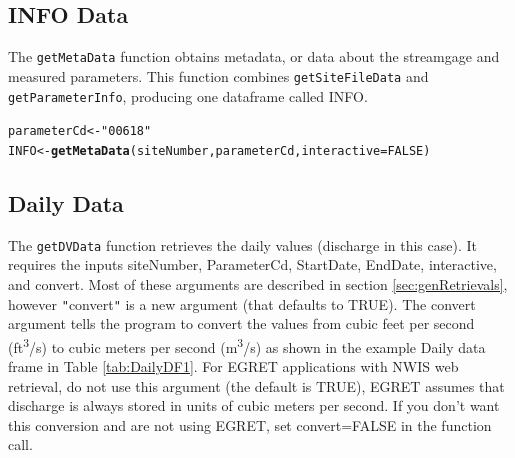 \documentclass[a4paper,11pt]{article}\usepackage[]{graphicx}\usepackage[]{color}
\makeatletter
\newcommand{\hlnum}[1]{\textcolor[rgb]{0.686,0.059,0.569}{#1}}%
\newcommand{\hlstr}[1]{\textcolor[rgb]{0.192,0.494,0.8}{#1}}%
\newcommand{\hlstd}[1]{\textcolor[rgb]{0.345,0.345,0.345}{#1}}%
\newcommand{\hlkwb}[1]{\textcolor[rgb]{0.69,0.353,0.396}{#1}}%
\newcommand{\hlkwc}[1]{\textcolor[rgb]{0.333,0.667,0.333}{#1}}%
\newcommand{\hlkwd}[1]{\textcolor[rgb]{0.737,0.353,0.396}{\textbf{#1}}}%
\newenvironment{kframe}{%
 \def\at@end@of@kframe{}%
 \ifinner\ifhmode%
  \def\at@end@of@kframe{\end{minipage}}%
  \begin{minipage}{\columnwidth}%
 \fi\fi%
 \def\FrameCommand##1{\hskip\@totalleftmargin \hskip-\fboxsep
 \colorbox{shadecolor}{##1}\hskip-\fboxsep
     \hskip-\linewidth \hskip-\@totalleftmargin \hskip\columnwidth}%
 \MakeFramed {\advance\hsize-\width
   \@totalleftmargin\z@ \linewidth\hsize
   \@setminipage}}%
 {\par\unskip\endMakeFramed%
 \at@end@of@kframe}
\newenvironment{knitrout}{}{} %
\makeatother
\begin{document}
\subsection{INFO Data}
\label{INFOsubsection}
The \texttt{getMetaData} function obtains metadata, or data about the streamgage and measured parameters. This function combines \texttt{getSiteFileData} and \texttt{getParameterInfo}, producing one dataframe called INFO.

\begin{knitrout}
\color{fgcolor}\begin{kframe}
\begin{alltt}
\hlstd{parameterCd} \hlkwb{<-} \hlstr{"00618"}
\hlstd{INFO} \hlkwb{<-}\hlkwd{getMetaData}\hlstd{(siteNumber,parameterCd,} \hlkwc{interactive}\hlstd{=}\hlnum{FALSE}\hlstd{)}
\end{alltt}
\end{kframe}
\end{knitrout}


\FloatBarrier

\subsection{Daily Data}
\label{Dailysubsection}
The \texttt{getDVData} function retrieves the daily values (discharge in this case).  It requires the inputs siteNumber, ParameterCd, StartDate, EndDate, interactive, and convert. Most of these arguments are described in section \ref{sec:genRetrievals}, however \texttt{"}convert\texttt{"} is a new argument (that defaults to TRUE). The convert argument tells the program to convert the values from cubic feet per second (ft\textsuperscript{3}/s) to cubic meters per second (m\textsuperscript{3}/s) as shown in the example Daily data frame in Table \ref{tab:DailyDF1}. For EGRET applications with NWIS web retrieval, do not use this argument (the default is TRUE), EGRET assumes that discharge is always stored in units of cubic meters per second. If you don't want this conversion and are not using EGRET, set convert=FALSE in the function call. 
\end{document}
